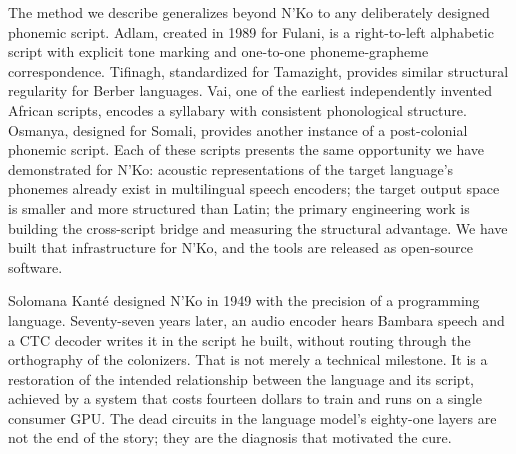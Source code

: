 \documentclass[11pt]{article}
\newcommand{\nko}{N'Ko}
\begin{document}
The method we describe generalizes beyond \nko{} to any deliberately designed phonemic script. Adlam, created in 1989 for Fulani, is a right-to-left alphabetic script with explicit tone marking and one-to-one phoneme-grapheme correspondence. Tifinagh, standardized for Tamazight, provides similar structural regularity for Berber languages. Vai, one of the earliest independently invented African scripts, encodes a syllabary with consistent phonological structure. Osmanya, designed for Somali, provides another instance of a post-colonial phonemic script. Each of these scripts presents the same opportunity we have demonstrated for \nko{}: acoustic representations of the target language's phonemes already exist in multilingual speech encoders; the target output space is smaller and more structured than Latin; the primary engineering work is building the cross-script bridge and measuring the structural advantage. We have built that infrastructure for \nko{}, and the tools are released as open-source software.

Solomana Kant\'e designed \nko{} in 1949 with the precision of a programming language. Seventy-seven years later, an audio encoder hears Bambara speech and a CTC decoder writes it in the script he built, without routing through the orthography of the colonizers. That is not merely a technical milestone. It is a restoration of the intended relationship between the language and its script, achieved by a system that costs fourteen dollars to train and runs on a single consumer GPU. The dead circuits in the language model's eighty-one layers are not the end of the story; they are the diagnosis that motivated the cure.
\end{document}

